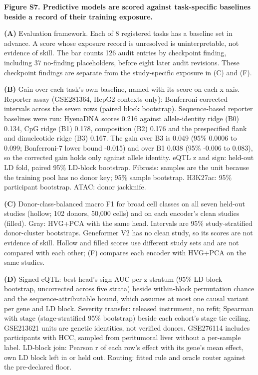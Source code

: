 \textbf{Figure S7. Predictive models are scored against task-specific baselines beside a record of their training exposure.}

\textbf{(A)} Evaluation framework. Each of 8 registered tasks has a baseline set in advance. A score whose exposure record is unresolved is uninterpretable, not evidence of skill. The bar counts 126 audit entries by checkpoint finding, including 37 no-finding placeholders, before eight later audit revisions. These checkpoint findings are separate from the study-specific exposure in (C) and (F).

\textbf{(B)} Gain over each task's own baseline, named with its score on each x axis. Reporter assay (GSE281364, HepG2 contexts only): Bonferroni-corrected intervals across the seven rows (paired block bootstrap). Sequence-based reporter baselines were run: HyenaDNA scores 0.216 against allele-identity ridge (B0) 0.134, CpG ridge (B1) 0.178, composition (B2) 0.176 and the prespecified flank and dinucleotide ridge (B3) 0.167. The gain over B3 is 0.049 (95\% 0.0006 to 0.099; Bonferroni-7 lower bound -0.015) and over B1 0.038 (95\% -0.006 to 0.083), so the corrected gain holds only against allele identity. eQTL \textbar z\textbar{} and sign: held-out LD fold, paired 95\% LD-block bootstrap. Fibrosis: samples are the unit because the training pool has no donor key; 95\% sample bootstrap. H3K27ac: 95\% participant bootstrap. ATAC: donor jackknife.

\textbf{(C)} Donor-class-balanced macro F1 for broad cell classes on all seven held-out studies (hollow; 102 donors, 50,000 cells) and on each encoder's clean studies (filled). Gray: HVG+PCA with the same head. Intervals are 95\% study-stratified donor-cluster bootstraps. Geneformer V2 has no clean study, so its scores are not evidence of skill. Hollow and filled scores use different study sets and are not compared with each other; (F) compares each encoder with HVG+PCA on the same studies.

\textbf{(D)} Signed eQTL: best head's sign AUC per \textbar z\textbar{} stratum (95\% LD-block bootstrap, uncorrected across five strata) beside within-block permutation chance and the sequence-attributable bound, which assumes at most one causal variant per gene and LD block. Severity transfer: released instrument, no refit; Spearman with stage (stage-stratified 95\% bootstrap) beside each cohort's stage tie ceiling. GSE213621 units are genetic identities, not verified donors. GSE276114 includes participants with HCC, sampled from peritumoral liver without a per-sample label. LD-block join: Pearson r of each row's effect with its gene's mean effect, own LD block left in or held out. Routing: fitted rule and oracle router against the pre-declared floor.

